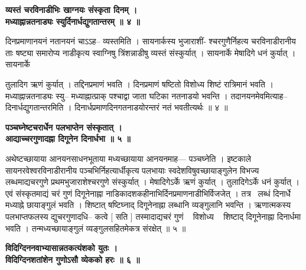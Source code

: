 \documentclass[11pt, openany]{book}
\begin{document}
{{{{\vspace{2mm}
\centering
\textbf{
  व्यस्तं चरविनाडीभिः खाग्नयः संस्कृता दिनम् ।\\
 मध्याह्नान्नतनाड्यः स्युर्दिनार्धद्युगतान्तरम् ॥ ४ ॥ }

\vspace{2mm}
\justifying
 दिनप्रमाणानयनं नतानयनं चाऽऽह-- व्यस्तमिति । सायनार्कस्य
भुजाराशीं-
श्चरगुणैर्निहत्य चरविनाडीरानीय ताः षष्ट्या समारोप्य नाडीकृत्य स्वाग्निषु
त्रिंशन्नाडीषु व्यस्तं संस्कुर्यात् । सायनार्के मेषादिगे धनं कुर्यात्
। सायनार्के 

\newpage
\thispagestyle{fancy}
\fancyhf{}
\rhead{[त्रिप्रश्नाधिकारः]}
\justifying
\noindent
तुलादिग ऋणं कुर्यात् । तद्दिनप्रमाणं भवति । दिनप्रमाणं षष्टितो
विशोध्य शिष्टं
रात्रिमानं भवति । मध्याह्नान्नतनाड्यः स्यु-- मध्याह्नात्प्राक्
पश्चाद्वा जाता
घटिका नतनाडयो भवन्ति । तदानयनमेवमित्याह--
दिनार्धद्युगतान्तरमिति ।
दिनार्धप्रमाणदिनगतनाडयोरन्तरं नतं भवतीत्यर्थः ॥ ४ ॥

\vspace{2mm}
\centering
\textbf{
\hspace{-1.4cm}
 पञ्चघ्नेष्टचरार्धेन पलभाप्तेन संस्कृतात् ।\\
 आद्याच्चरगुणादह्ना दिगूनेन दिनार्धभा ॥ ५ ॥}

\vspace{2mm}
\justifying
 अथेष्टच्छायाया आनयनसाधनभूताया मध्यच्छायाया आनयनमाह---  पञ्चघ्नेति ।
इष्टकाले सायनरवेश्वरविनाडीरानीय पञ्चभिर्निहत्यार्धीकृत्य
पलभायाः
स्वदेशविषुवच्छायाङ्गुलेन विभज्य लब्धमाद्यचरगुणे प्रथमभुजाराशेश्चरगुणे
संस्कुर्यात् । मेषादिगेऽर्के ऋणं कुर्यात् । तुलादिगेऽर्के धनं
कुर्यात् । एवं संस्कृतमाद्यं
चरं गुणं दिगूनेनाह्ना नाडिकादशकहीनाभिर्दिनप्रमाणनाडीभिर्विजजेत् ।
तत्र  लब्धं दिनार्धे मध्याह्ने छायाङ्गुलं भवति । शिष्टात् षष्टिघ्नाद्
दिगूनेनाह्ना
लब्धानि व्यङ्गुलानि भवन्ति । ऋणात्मकस्य पलभाप्तफलस्य द्युचरगुणादधि-- कत्वे [ सति ] तस्मादाद्यचरं गुणं   विशोध्य   शिष्टाद् दिगूनेनाह्ना
   दिनार्धमा
भवति । तन्मध्यच्छायाङ्गुलं व्यङ्गुलसहितमेकत्र संरक्षेत् ॥ ५ ॥

\vspace{2mm}
\centering
\hspace{-1.8cm}
\textbf{
 विदिग्दिननवाभ्यासान्नतकत्यंशको युतः ।\\
 विदिग्दिनशतांशेन गुणोऽसौ व्येकको हरः ॥ ६ ॥}

}}}}
\end{document}
